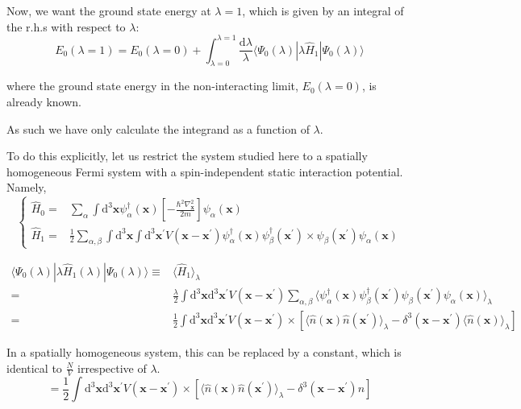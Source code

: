Now, we want the ground state energy at $\lambda=1$, which is given by an integral of the r.h.s with respect to $\lambda$:
\begin{equation} \label{Eqs2.8.1}
E_0(\lambda=1) = E_0(\lambda=0) + \int_{\lambda=0}^{\lambda=1} \frac{\mathrm{d}\lambda}{\lambda}\langle \Psi_0(\lambda)|\lambda\hat{H}_1|\Psi_0(\lambda) \rangle
\end{equation}

where the ground state energy in the non-interacting limit, $E_0(\lambda=0)$, is already known.

As such we have only calculate the integrand as a function of $\lambda$.

To do this explicitly, let us restrict the system studied here to a spatially homogeneous Fermi system with a spin-independent static interaction potential. Namely,
\[ \left\{ \begin{aligned}
\hat{H}_0 =& \sum_{\alpha} \int \mathrm{d}^3 \mathbf{x} \psi_\alpha^\dagger(\mathbf{x})\left[ - \frac{\hbar^2\nabla_{\mathbf{x}}^2}{2m} \right] \psi_\alpha(\mathbf{x})\\
\hat{H}_1 =& \frac{1}{2}\sum_{\alpha,\beta} \int \mathrm{d}^3 \mathbf{x} \int \mathrm{d}^3 \mathbf{x}^{'} V(\mathbf{x}-\mathbf{x}^{'})\psi_\alpha^\dagger(\mathbf{x}) \psi_\beta^\dagger(\mathbf{x}^{'}) \times\psi_\beta(\mathbf{x}^{'})\psi_\alpha(\mathbf{x})
\end{aligned}\right. \]

\[ \begin{split}
\langle \Psi_0(\lambda)  | \lambda \hat{H}_1(\lambda) |  \Psi_0(\lambda)  \rangle \equiv& \langle\hat{H}_1\rangle_\lambda\\
=& \frac{\lambda}{2}\int \mathrm{d}^3 \mathbf{x} \mathrm{d}^3 \mathbf{x}^{'} V(\mathbf{x}-\mathbf{x}^{'})\sum_{\alpha,\beta}
\langle \psi_\alpha^\dagger(\mathbf{x}) \psi_\beta^\dagger(\mathbf{x}^{'}) \psi_\beta(\mathbf{x}^{'})\psi_\alpha(\mathbf{x}) \rangle_\lambda\\
=& \frac{1}{2}\int \mathrm{d}^3\mathbf{x}\mathrm{d}^3\mathbf{x}^{'}
V(\mathbf{x}-\mathbf{x}^{'}) \times
\left[ \langle \hat{n}(\mathbf{x}) \hat{n}(\mathbf{x}^{'}) \rangle_\lambda - \delta^3(\mathbf{x}-\mathbf{x}^{'})\langle \hat{n}(\mathbf{x}) \rangle_\lambda \right]
\end{split}\]

In a spatially homogeneous system, this can be replaced by a constant, which is identical to $\frac{N}{V}$ irrespective of $\lambda$.
\[ = \frac{1}{2}\int \mathrm{d}^3\mathbf{x}\mathrm{d}^3\mathbf{x}^{'}
V(\mathbf{x}-\mathbf{x}^{'}) \times
\left[ \langle \hat{n}(\mathbf{x}) \hat{n}(\mathbf{x}^{'}) \rangle_\lambda - \delta^3(\mathbf{x}-\mathbf{x}^{'}) n \right] \]

